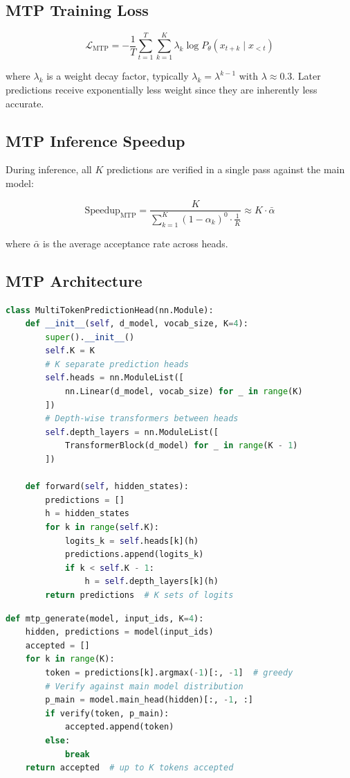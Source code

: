 \documentclass[11pt,a4paper]{article}
\begin{document}
\subsection{MTP Training Loss}

$$\mathcal{L}_{\text{MTP}} = -\frac{1}{T} \sum_{t=1}^{T} \sum_{k=1}^{K} \lambda_k \log P_\theta(x_{t+k} \mid x_{<t})$$

where $\lambda_k$ is a weight decay factor, typically $\lambda_k = \lambda^{k-1}$ with $\lambda \approx 0.3$. Later predictions receive exponentially less weight since they are inherently less accurate.

\subsection{MTP Inference Speedup}

During inference, all $K$ predictions are verified in a single pass against the main model:

$$\text{Speedup}_{\text{MTP}} = \frac{K}{\sum_{k=1}^{K} (1 - \alpha_k)^0 \cdot \frac{1}{K}} \approx K \cdot \bar{\alpha}$$

where $\bar{\alpha}$ is the average acceptance rate across heads.

\subsection{MTP Architecture}

\begin{lstlisting}[language=Python, caption={Multi-Token Prediction Head (Simplified)}]
class MultiTokenPredictionHead(nn.Module):
    def __init__(self, d_model, vocab_size, K=4):
        super().__init__()
        self.K = K
        # K separate prediction heads
        self.heads = nn.ModuleList([
            nn.Linear(d_model, vocab_size) for _ in range(K)
        ])
        # Depth-wise transformers between heads
        self.depth_layers = nn.ModuleList([
            TransformerBlock(d_model) for _ in range(K - 1)
        ])
    
    def forward(self, hidden_states):
        predictions = []
        h = hidden_states
        for k in range(self.K):
            logits_k = self.heads[k](h)
            predictions.append(logits_k)
            if k < self.K - 1:
                h = self.depth_layers[k](h)
        return predictions  # K sets of logits
\end{lstlisting}

\begin{lstlisting}[language=Python, caption={MTP Inference: Verify All K Predictions in One Pass}]
def mtp_generate(model, input_ids, K=4):
    hidden, predictions = model(input_ids)
    accepted = []
    for k in range(K):
        token = predictions[k].argmax(-1)[:, -1]  # greedy
        # Verify against main model distribution
        p_main = model.main_head(hidden)[:, -1, :]
        if verify(token, p_main):
            accepted.append(token)
        else:
            break
    return accepted  # up to K tokens accepted
\end{lstlisting}
\end{document}

